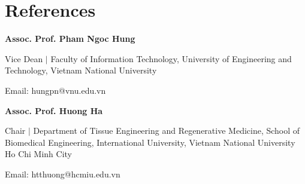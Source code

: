 \documentclass[letterpaper,11pt]{article}
\begin{document}
\section{References}
\vspace{2pt}

\textbf{Assoc. Prof. Pham Ngoc Hung}

\vspace{0.25em}
Vice Dean $\mid$ Faculty of Information Technology, University of Engineering and Technology, Vietnam National University

\vspace{0.25em}
Email: hungpn@vnu.edu.vn

\vspace{0.5em}

\textbf{Assoc. Prof. Huong Ha}

\vspace{0.25em}
Chair $\mid$ Department of Tissue Engineering and Regenerative Medicine, School of Biomedical Engineering, International University, Vietnam National University Ho Chi Minh City

\vspace{0.25em}
Email: htthuong@hcmiu.edu.vn
\end{document}
